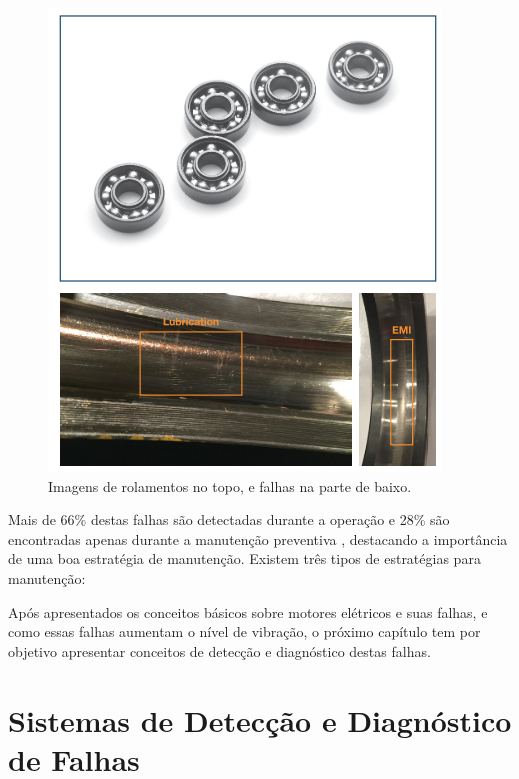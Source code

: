 \begin{figure}[H]
    \caption{Imagens de rolamentos no topo, e falhas na parte de baixo.}
    \begin{center}
        \includegraphics[scale=.5]{referencial/img/bearing_analog_p3.png}
    \end{center}
    \label{fig:bearing_analog_p3}
\end{figure}

Mais de 66\% destas falhas são detectadas durante a operação e 28\% são encontradas apenas durante a manutenção 
preventiva , destacando a importância de uma boa estratégia de manutenção. Existem três tipos de estratégias 
para manutenção: 

Após apresentados os conceitos básicos sobre motores elétricos e suas falhas, e como essas falhas aumentam o nível de vibração,
o próximo capítulo tem por objetivo apresentar conceitos de detecção e diagnóstico destas falhas.


% 

\section{Sistemas de Detecção e Diagnóstico de Falhas}\label{sec:}

